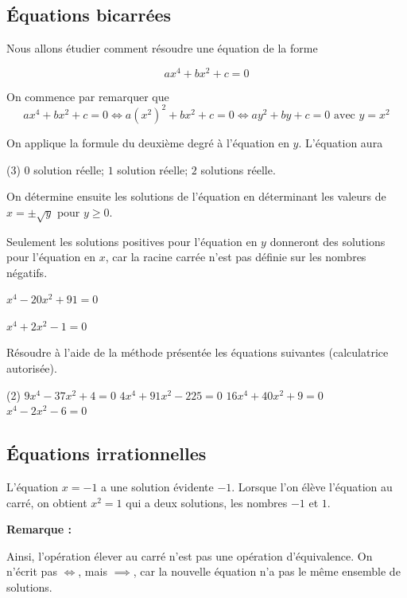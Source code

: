 \documentclass[a4paper,12pt]{article}
\begin{document}
\subsection{Équations bicarrées}
Nous allons étudier comment résoudre une équation de la forme

\[ax^4+bx^2+c=0\]

On commence par remarquer que 
\[ax^4+bx^2+c=0 \iff a(x^2)^2+bx^2+c=0 \iff ay^2+by+c=0 \text{ avec } y=x^2\]

On applique la formule du deuxième degré à l'équation en $y$. L'équation aura 
\begin{tasks}(3)
	\task[] $0$ solution réelle;
	\task[] $1$ solution réelle;
	\task[] $2$ solutions réelle.
\end{tasks}
On détermine ensuite les solutions de l'équation en déterminant les valeurs de $x=\pm\sqrt{y}$ pour $y\geq 0$.
\medskip

Seulement les solutions positives pour l'équation en $y$ donneront des solutions pour l'équation en $x$, car la racine carrée n'est pas définie sur les nombres négatifs.

\begin{exemple}
	$x^4-20x^2+91=0$
	\tcblower
\vspace{10cm}
\end{exemple}
\newpage 
\begin{exemple}
	$x^4+2x^2-1=0$
	\tcblower
\vspace{15cm}
\end{exemple}

\begin{exercice}
	\tcblower
	Résoudre à l'aide de la méthode présentée les équations suivantes (calculatrice autorisée). 
\begin{tasks}(2)
	\task $9 x^4-37 x^2+4=0$
	\task $4 x^4+91 x^2-225=0$
	\task $16 x^4+40 x^2+9=0$
	\task $x^4-2 x^2-6=0$
\end{tasks}
\end{exercice}

\newpage
\subsection{Équations irrationnelles}
L'équation $x=-1$ a une solution évidente $-1$. Lorsque l'on élève l'équation au carré, on obtient $x^2=1$ qui a deux solutions, les nombres $-1$ et $1$. 

{\bfseries Remarque :}
\vspace{4cm}

Ainsi, l'opération \og{} élever au carré \fg{} n'est pas une opération d'équivalence. On n'écrit pas \og{}$\iff$\fg{}, mais \og{}$\implies$\fg{}, car la nouvelle équation n'a pas le même ensemble de solutions.
\end{document}
